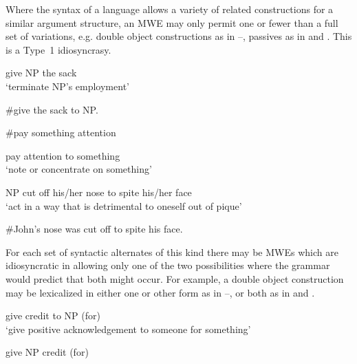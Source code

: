 \documentclass[output=paper]{langsci/langscibook}
\begin{document}
Where the syntax of a language allows a variety of related constructions for a similar argument structure, an MWE may only permit one or fewer than a full set of variations, e.g. double object constructions as in --, passives as in  and . This is a Type~1 idiosyncrasy.

\begin{exe}
\ex\label{ex:ex38} give NP the sack\\
‘terminate NP’s employment’

\ex\label{ex:ex39} \#give the sack to NP.

\ex\label{ex:ex40} \#pay something attention

\ex\label{ex:ex41} pay attention to something\\
‘note or concentrate on something’

\ex\label{ex:ex42} NP cut off his/her nose to spite his/her face\\
‘act in a way that is detrimental to oneself out of pique’

\ex\label{ex:ex43} \#John’s nose was cut off to spite his face.
\end{exe}

For each set of syntactic alternates of this kind there may be MWEs which are idiosyncratic in allowing only one of the two possibilities where the grammar would predict that both might occur. For example, a double object construction may be lexicalized in either one or other form as in --, or both as in  and .

\begin{exe}
\ex\label{ex:ex44} give credit to NP (for)\\
‘give positive acknowledgement to someone for something’

\ex\label{ex:ex45} give NP credit (for)
\end{exe}
\end{document}
